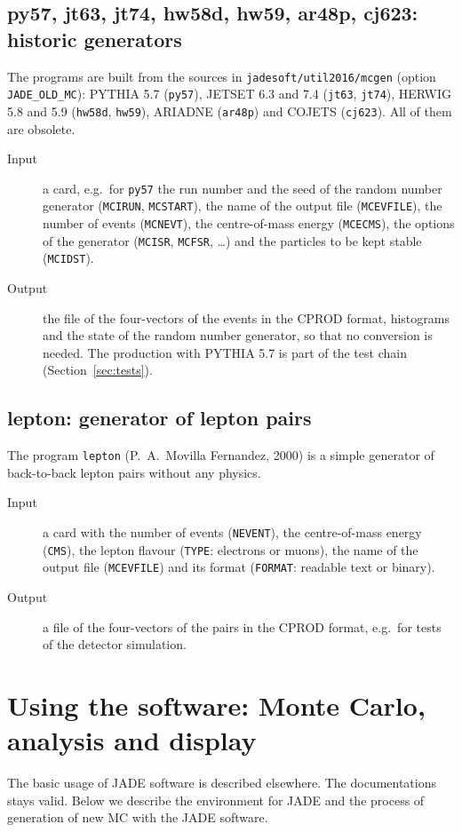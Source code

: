 \subsection{py57, jt63, jt74, hw58d, hw59, ar48p, cj623: historic generators}
The programs are built from the sources in \texttt{jadesoft/\allowbreak{}util2016/\allowbreak{}mcgen} (option \texttt{JADE\_\allowbreak{}OLD\_\allowbreak{}MC}): PYTHIA 5.7 (\texttt{py57}),
JETSET 6.3 and 7.4 (\texttt{jt63}, \texttt{jt74}), HERWIG 5.8 and 5.9 (\texttt{hw58d}, \texttt{hw59}), ARIADNE (\texttt{ar48p}) and COJETS (\texttt{cj623}). All of them are obsolete.
\begin{description}
\item[Input] a card, e.g.\ for \texttt{py57} the run number and the seed of the random number generator (\texttt{MCIRUN}, \texttt{MCSTART}), the name of the output file
(\texttt{MCEVFILE}), the number of events (\texttt{MCNEVT}), the centre-of-mass energy (\texttt{MCECMS}), the options of the generator (\texttt{MCISR}, \texttt{MCFSR},
\dots) and the particles to be kept stable (\texttt{MCIDST}).
\item[Output] the file of the four-vectors of the events in the CPROD format, histograms and the state of the random number generator, so that no conversion is needed.
The production with PYTHIA 5.7 is part of the test chain (Section~\ref{sec:tests}).
\end{description}

\subsection{lepton: generator of lepton pairs}
The program \texttt{lepton} (P.~A.~Movilla Fernandez, 2000) is a simple generator of back-to-back lepton pairs without any physics.
\begin{description}
\item[Input] a card with the number of events (\texttt{NEVENT}), the centre-of-mass energy (\texttt{CMS}), the lepton flavour (\texttt{TYPE}: electrons or muons), the name of the
output file (\texttt{MCEVFILE}) and its format (\texttt{FORMAT}: readable text or binary).
\item[Output] a file of the four-vectors of the pairs in the CPROD format, e.g.\ for tests of the detector simulation.
\end{description}

\section{Using the software: Monte Carlo, analysis and display}
The basic usage of JADE software is described elsewhere.
The documentations stays valid.
Below we describe the environment for JADE and the process of generation of new MC with the JADE software.

